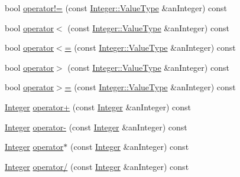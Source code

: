 \begin{DoxyCompactItemize}
bool \hyperlink{classostk_1_1core_1_1types_1_1_integer_aac060d7013e5a65be3ad78c02d73ef48}{operator!=} (const \hyperlink{classostk_1_1core_1_1types_1_1_integer_a76a5f41f78659f116eafaf26cecc3244}{Integer\+::\+Value\+Type} \&an\+Integer) const
\item 
bool \hyperlink{classostk_1_1core_1_1types_1_1_integer_a414548080c8c6d86cbb8aefd7c955b6e}{operator$<$} (const \hyperlink{classostk_1_1core_1_1types_1_1_integer_a76a5f41f78659f116eafaf26cecc3244}{Integer\+::\+Value\+Type} \&an\+Integer) const
\item 
bool \hyperlink{classostk_1_1core_1_1types_1_1_integer_a271b38ab9bf7c6c791f21062bbc427c6}{operator$<$=} (const \hyperlink{classostk_1_1core_1_1types_1_1_integer_a76a5f41f78659f116eafaf26cecc3244}{Integer\+::\+Value\+Type} \&an\+Integer) const
\item 
bool \hyperlink{classostk_1_1core_1_1types_1_1_integer_a2a3fdce6ecee0ce12df23a66bca1c640}{operator$>$} (const \hyperlink{classostk_1_1core_1_1types_1_1_integer_a76a5f41f78659f116eafaf26cecc3244}{Integer\+::\+Value\+Type} \&an\+Integer) const
\item 
bool \hyperlink{classostk_1_1core_1_1types_1_1_integer_af09f62266905dd531a97356fd7f8305f}{operator$>$=} (const \hyperlink{classostk_1_1core_1_1types_1_1_integer_a76a5f41f78659f116eafaf26cecc3244}{Integer\+::\+Value\+Type} \&an\+Integer) const
\item 
\hyperlink{classostk_1_1core_1_1types_1_1_integer}{Integer} \hyperlink{classostk_1_1core_1_1types_1_1_integer_a8b2c8273c945da37bedd1a5ef43a7c6b}{operator+} (const \hyperlink{classostk_1_1core_1_1types_1_1_integer}{Integer} \&an\+Integer) const
\item 
\hyperlink{classostk_1_1core_1_1types_1_1_integer}{Integer} \hyperlink{classostk_1_1core_1_1types_1_1_integer_a23973d958a08217e13caac52512306b4}{operator-\/} (const \hyperlink{classostk_1_1core_1_1types_1_1_integer}{Integer} \&an\+Integer) const
\item 
\hyperlink{classostk_1_1core_1_1types_1_1_integer}{Integer} \hyperlink{classostk_1_1core_1_1types_1_1_integer_a289a931e70f65bf6ffcca32f9122981b}{operator$\ast$} (const \hyperlink{classostk_1_1core_1_1types_1_1_integer}{Integer} \&an\+Integer) const
\item 
\hyperlink{classostk_1_1core_1_1types_1_1_integer}{Integer} \hyperlink{classostk_1_1core_1_1types_1_1_integer_af35aa59d63f4861472cfa94664904d68}{operator/} (const \hyperlink{classostk_1_1core_1_1types_1_1_integer}{Integer} \&an\+Integer) const
\item 

\end{DoxyCompactItemize}

